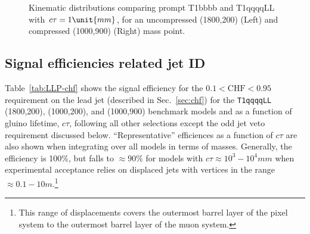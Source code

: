 \begin{figure}[h!]
\begin{center}
     \\
     ~
    \caption{Kinematic distributions comparing prompt T1bbbb and
      T1qqqqLL with $\ctau = 1\unit{mm}$, for an uncompressed
      (1800,200) (Left) and compressed (1000,900) (Right) mass point.}
    \label{fig:T1qqqqLLvsT1bbbb}
  \end{center}
\end{figure}

\clearpage
\subsection{Signal efficiencies related jet ID}
\label{app:LLP-jetid}

Table~\ref{tab:LLP-chf} shows the signal efficiency for the $0.1 <
\text{CHF} < 0.95$ requirement on the lead jet (described in
Sec.~\ref{sec:chf}) for the \texttt{T1qqqqLL} (1800,200), (1000,200),
and (1000,900) benchmark models and as a function of gluino lifetime,
$c\tau$, following all other selections except the odd jet veto
requirement discussed below. ``Representative'' efficiences as a
function of $c\tau$ are also shown when integrating over all models in
terms of masses.  Generally, the efficiency is 100\%, but falls to
${\approx}90\%$ for models with $c\tau \approx 10^{3} -
10^{4}\unit{mm}$ when experimental acceptance relies on displaced jets
with vertices in the range $\approx 0.1-10\unit{m}$.\footnote{This
  range of displacements covers the outermost barrel layer of the
  pixel system to the outermost barrel layer of the muon system.}

